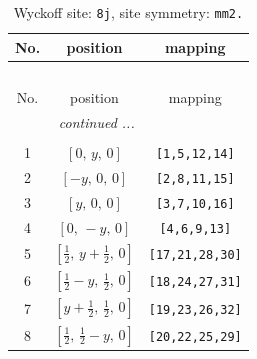 \documentclass[fleqn,8pt]{jsarticle}
\begin{document}
\begin{longtable}{ccc}
\caption{Wyckoff site: {\tt 8j}, site symmetry: {\tt mm2.}}
 \\
 \hline \hline
No. & position & mapping \\ \hline \endfirsthead

\multicolumn{2}{l}{\tablename\ \thetable{}} \\
 \hline \hline
No. & position & mapping \\ \hline \endhead

 \hline \hline
\multicolumn{2}{r}{\footnotesize\it continued ...} \\ \endfoot

 \hline \hline
\multicolumn{2}{r}{} \\ \endlastfoot

1 & $\left[ 0,\, y,\, 0 \right]$ & {\tt [1,5,12,14]} \\ \hline
2 & $\left[ - y,\, 0,\, 0 \right]$ & {\tt [2,8,11,15]} \\ \hline
3 & $\left[ y,\, 0,\, 0 \right]$ & {\tt [3,7,10,16]} \\ \hline
4 & $\left[ 0,\, - y,\, 0 \right]$ & {\tt [4,6,9,13]} \\ \hline
5 & $\left[ \frac{1}{2},\, y + \frac{1}{2},\, 0 \right]$ & {\tt [17,21,28,30]} \\ \hline
6 & $\left[ \frac{1}{2} - y,\, \frac{1}{2},\, 0 \right]$ & {\tt [18,24,27,31]} \\ \hline
7 & $\left[ y + \frac{1}{2},\, \frac{1}{2},\, 0 \right]$ & {\tt [19,23,26,32]} \\ \hline
8 & $\left[ \frac{1}{2},\, \frac{1}{2} - y,\, 0 \right]$ & {\tt [20,22,25,29]} \\
\end{longtable}
\renewcommand{\arraystretch}{1.2}
\end{document}

